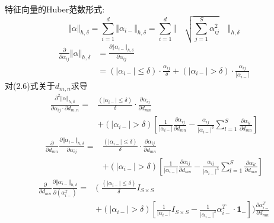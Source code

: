 \documentclass[245.0pt]{article}
\begin{document}
特征向量的Huber范数形式:
\begin{equation*}
\Vert \alpha \Vert_{h,\delta} = \sum_{i=1}^{d} \Vert \alpha_{i-} \Vert_{h,\delta} = \sum_{i=1}^{d} \Vert \quad \sqrt{\sum_{j=1}^{S}\alpha_{ij}^{2} } \quad \Vert_{h,\delta} \tag{2.5}
\end{equation*}
\begin{align*}
\frac{\partial}{\partial\alpha_{ij}}\Vert \alpha \Vert_{h,\delta}&= \frac{\partial\Vert \alpha_{i-} \Vert_{h,\delta}}{\partial \alpha_{ij}}\\
&= (\vert \alpha_{i-} \vert \leq \delta ) \cdot \frac{\alpha_{ij}}{\delta} + (\vert \alpha_{i-} \vert > \delta ) \cdot \frac{\alpha_{ij}}{\vert \alpha_{i-} \vert}\tag{2.6}
\end{align*}
对(2.6)式关于$d_{m,n}$求导
\begin{align*}
\frac{\partial^2 \Vert \alpha \Vert_{h,\delta}}{\partial \alpha_{ij} \cdot \partial d_{m,n}} = &\frac{(\vert \alpha_{i-} \vert \leq \delta)}{\delta} \cdot \frac{\partial \alpha_{ij}}{\partial d_{mn}}\\
& +(\vert \alpha_{i-} \vert > \delta) \left[ \frac{1}{\vert \alpha_{i-}\vert} \frac{\partial \alpha_{ij}}{\partial d_{mn}} - \frac{\alpha_{ij}}{\vert \alpha_{i-} \vert^3} \sum_{l=1}^{S} \frac{\partial \alpha_{il}}{\partial d_{mn}} \right] \tag{2.7}
\end{align*}
\begin{align*}
\frac{\partial}{\partial d_{mn}} \frac{\partial \Vert \alpha_{i-} \Vert_{h,\delta}}{\partial \alpha_{ij}} = &\frac{(\vert \alpha_{i-}\vert \leq \delta)}{\delta} \cdot \frac{\partial \alpha_{ij}}{\partial d_{mn}}\\
& + (\vert \alpha_{i-} \vert > \delta)\left[\frac{1}{\vert \alpha_{i-} \vert} \frac{\partial \alpha_{ij}}{\partial d_{mn}} - \frac{\alpha_{ij}}{\vert \alpha_{i-}\vert^3} \sum_{l=1}^S \frac{\partial \alpha_{il}}{\partial d_{mn}} \right] \tag{2.8}
\end{align*}
\begin{align*}
\frac{\partial}{\partial d_{mn}} \frac{\partial \Vert \alpha_{i-} \Vert_{h,\delta}}{\partial (\alpha_{i-}^T)} = &( \; \frac{(\vert \alpha_{i-} \vert \leq \delta)}{\delta}  I_{S\times S}\\
& + (\vert \alpha_{i-} \vert > \delta ) \left[ \frac{1}{\vert \alpha_{i-} \vert}I_{S\times S} - \frac{1}{\vert \alpha_{i-} \vert^3} \alpha_{i-}^T \cdot \boldsymbol{1_{-}} \right] ) \frac{\partial \alpha_{i-}^T }{\partial d_{mn}} \tag{2.9}
\end{align*}
\end{document}
